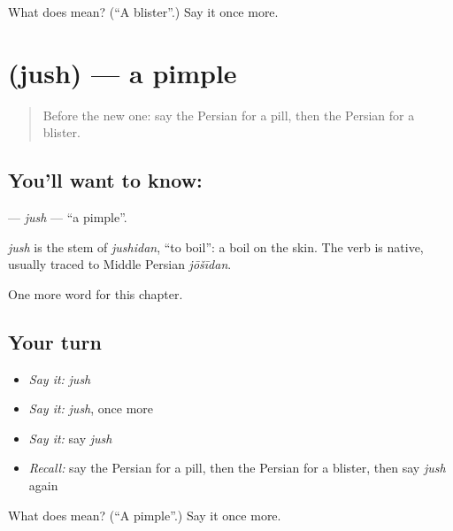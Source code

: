 \begin{tcolorbox}[breakable,colback=teal!4,colframe=teal!35!black,title={Before you move on}]
What does  mean? (\textquotedblleft{}A blister\textquotedblright{}.) Say it once more.
\end{tcolorbox}
\section[\texorpdfstring{\fa{جوش} (jush)}{جوش (jush)}]{ (jush) — a pimple}

\label{lesson:FA-C151-jush}



\begin{quote}
Before the new one: say the Persian for a pill, then the Persian for a blister.
\end{quote}

\subsection*{You'll want to know: }
\textbf{} — \emph{jush} — \textquotedblleft{}a pimple\textquotedblright{}.

\begin{cousinweb}
\emph{jush} is the stem of \emph{jushidan}, \textquotedblleft{}to boil\textquotedblright{}: a boil on the skin. The verb is native, usually traced to Middle Persian \emph{jōšīdan}.
\end{cousinweb}

\begin{grammarlens}[title={What you've built}]
One more word for this chapter.
\end{grammarlens}

\subsection*{Your turn}
\begin{itemize}
\raggedright
  \item \emph{Say it:} \emph{jush}
  \item \emph{Say it:} \emph{jush}, once more
  \item \emph{Say it:} say \emph{jush}
  \item \emph{Recall:} say the Persian for a pill, then the Persian for a blister, then say \emph{jush} again
\end{itemize}

\begin{tcolorbox}[breakable,colback=teal!4,colframe=teal!35!black,title={Before you move on}]
What does  mean? (\textquotedblleft{}A pimple\textquotedblright{}.) Say it once more.
\end{tcolorbox}
